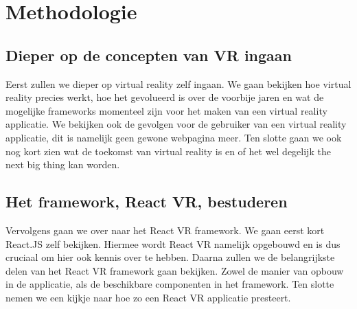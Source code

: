 
\chapter{Methodologie}
\label{ch:methodologie}


\section{Dieper op de concepten van VR ingaan}
\label{sec:dieper-op-vr-ingaan}
Eerst zullen we dieper op virtual reality zelf ingaan. We gaan bekijken hoe virtual reality precies werkt, hoe het gevolueerd is over de voorbije jaren en wat de mogelijke frameworks momenteel zijn voor het maken van een virtual reality applicatie. We bekijken ook de gevolgen voor de gebruiker van een virtual reality applicatie, dit is namelijk geen gewone webpagina meer. Ten slotte gaan we ook nog kort zien wat de toekomst van virtual reality is en of het wel degelijk the next big thing kan worden.

\section{Het framework, React VR, bestuderen}
\label{sec:reactvr-bestuderen}
Vervolgens gaan we over naar het React VR framework. We gaan eerst kort React.JS zelf bekijken. Hiermee wordt React VR namelijk opgebouwd en is dus cruciaal om hier ook kennis over te hebben. Daarna zullen we de belangrijkste delen van het React VR framework gaan bekijken. Zowel de manier van opbouw in de applicatie, als de beschikbare componenten in het framework. Ten slotte nemen we een kijkje naar hoe zo een React VR applicatie presteert.

